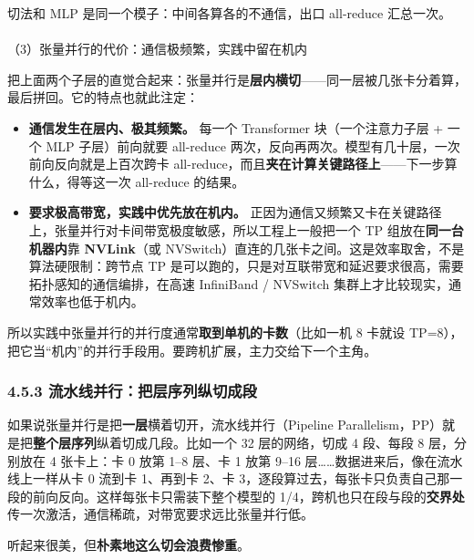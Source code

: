 \documentclass[
  chinese,
]{ctexart}
\makeatletter
\let\oldparagraph\paragraph
\renewcommand{\paragraph}{
    \@ifstar
      \xxxParagraphStar
      \xxxParagraphNoStar
  }
\newcommand{\xxxParagraphStar}[1]{\oldparagraph*{#1}\mbox{}}
\newcommand{\xxxParagraphNoStar}[1]{\oldparagraph{#1}\mbox{}}
\providecommand{\tightlist}{%
  \setlength{\itemsep}{0pt}\setlength{\parskip}{0pt}}
\makeatother
\begin{document}
切法和 MLP 是同一个模子：中间各算各的不通信，出口 all-reduce 汇总一次。

\paragraph{（3）张量并行的代价：通信极频繁，实践中留在机内}\label{ux5f20ux91cfux5e76ux884cux7684ux4ee3ux4ef7ux901aux4fe1ux6781ux9891ux7e41ux5b9eux8df5ux4e2dux7559ux5728ux673aux5185}

把上面两个子层的直觉合起来：张量并行是\textbf{层内横切}------同一层被几张卡分着算，最后拼回。它的特点也就此注定：

\begin{itemize}
\tightlist
\item
  \textbf{通信发生在层内、极其频繁。} 每一个 Transformer
  块（一个注意力子层 + 一个 MLP 子层）前向就要 all-reduce
  两次，反向再两次。模型有几十层，一次前向反向就是上百次跨卡
  all-reduce，而且\textbf{夹在计算关键路径上}------下一步算什么，得等这一次
  all-reduce 的结果。
\item
  \textbf{要求极高带宽，实践中优先放在机内。}
  正因为通信又频繁又卡在关键路径上，张量并行对卡间带宽极度敏感，所以工程上一般把一个
  TP 组放在\textbf{同一台机器内}靠 \textbf{NVLink}（或
  NVSwitch）直连的几张卡之间。这是效率取舍，不是算法硬限制：跨节点 TP
  是可以跑的，只是对互联带宽和延迟要求很高，需要拓扑感知的通信编排，在高速
  InfiniBand / NVSwitch 集群上才比较现实，通常效率也低于机内。
\end{itemize}

所以实践中张量并行的并行度通常\textbf{取到单机的卡数}（比如一机 8 卡就设
TP=8），把它当``机内''的并行手段用。要跨机扩展，主力交给下一个主角。

\subsubsection{4.5.3
流水线并行：把层序列纵切成段}\label{ux6d41ux6c34ux7ebfux5e76ux884cux628aux5c42ux5e8fux5217ux7eb5ux5207ux6210ux6bb5}

如果说张量并行是把\textbf{一层}横着切开，流水线并行（Pipeline
Parallelism，PP）就是把\textbf{整个层序列}纵着切成几段。比如一个 32
层的网络，切成 4 段、每段 8 层，分别放在 4 张卡上：卡 0 放第 1--8 层、卡
1 放第 9--16 层\ldots\ldots 数据进来后，像在流水线上一样从卡 0 流到卡
1、再到卡 2、卡
3，逐段算过去，每张卡只负责自己那一段的前向反向。这样每张卡只需装下整个模型的
1/4，跨机也只在段与段的\textbf{交界处}传一次激活，通信稀疏，对带宽要求远比张量并行低。

听起来很美，但\textbf{朴素地这么切会浪费惨重}。
\end{document}
